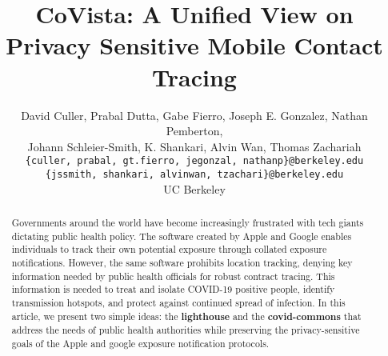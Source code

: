 \documentclass[11pt]{article}
\title{CoVista: A Unified View on Privacy Sensitive Mobile Contact Tracing}
\author{David Culler, Prabal Dutta, Gabe Fierro, Joseph E. Gonzalez, Nathan Pemberton, \\
Johann Schleier-Smith, K. Shankari, Alvin Wan, Thomas Zachariah \\
{\small \texttt{\{culler, prabal, gt.fierro, jegonzal, nathanp\}@berkeley.edu}}\\
{\small \texttt{\{jssmith, shankari, alvinwan, tzachari\}@berkeley.edu}}\\
UC Berkeley
}
\begin{document}
\maketitle

\begin{abstract}
Governments around the world have become increasingly frustrated with tech giants dictating public health policy. The software created by Apple and Google enables individuals to track their own potential exposure through collated exposure notifications. However, the same software prohibits location tracking, denying key information needed by public health officials for robust contract tracing. This information is needed to treat and isolate COVID-19 positive people, identify transmission hotspots, and protect against continued spread of infection.
In this article, we present two simple ideas: the \textbf{lighthouse} and the \textbf{covid-commons} that address the needs of public health authorities while preserving the privacy-sensitive goals of the Apple and google exposure notification protocols. 
\end{abstract}













% 
% 
% 
\end{document}
